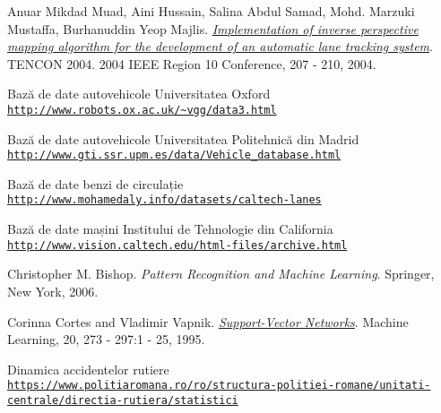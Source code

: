 \begin{thebibliography}{9}
	
	\hypertarget{AnuarMikdadMuadAiniHussainSalinaAbdulSamadMohdMarzukiMustaffaBurhanuddinYeopMajlis}{} 
	Anuar Mikdad Muad, Aini Hussain, Salina Abdul Samad, Mohd. Marzuki Mustaffa, Burhanuddin Yeop Majlis.
	\textit{\href{http://ieeexplore.ieee.org/abstract/document/1414393/}{Implementation of inverse perspective mapping algorithm for the development of an automatic lane tracking system}}.
	TENCON 2004. 2004 IEEE Region 10 Conference, 207 - 210, 2004.
		
	\hypertarget{BazădedateautovehicoleUniversitateaOxford}{} 
	Bază de date autovehicole Universitatea Oxford
	\\\texttt{\url{http://www.robots.ox.ac.uk/~vgg/data3.html}}
	
	\hypertarget{BazădedateautovehicoleUniversitateaPolitehnicădinMadrid}{} 
	Bază de date autovehicole Universitatea Politehnică din Madrid
	\\\texttt{\url{http://www.gti.ssr.upm.es/data/Vehicle\_database.html}}
	
	\hypertarget{Bazădedatebenzidecirculație}{} 
	Bază de date benzi de circulație
	\\\texttt{\url{http://www.mohamedaly.info/datasets/caltech-lanes}}
	
	\hypertarget{BazădedatemașiniInstituluideTehnologiedinCalifornia}{} 
	Bază de date mașini Institului de Tehnologie din California
	\\\texttt{\url{http://www.vision.caltech.edu/html-files/archive.html}}
	
	\hypertarget{ChristopherBishop}{} 
	Christopher M. Bishop. 
	\textit{Pattern Recognition and Machine Learning}. 
	Springer, New York, 2006.
	
	\hypertarget{CorinnaCortesVladimirVapnik}{} 
	Corinna Cortes and Vladimir Vapnik.
	\textit{\href{http://image.diku.dk/imagecanon/material/cortes_vapnik95.pdf}{Support-Vector Networks}}.
	Machine Learning, 20, 273 - 297:1 - 25, 1995.
	
	\hypertarget{Dinamicaaccidentelorrutiere}{}  
	Dinamica accidentelor rutiere
	\\\texttt{\url{https://www.politiaromana.ro/ro/structura-politiei-romane/unitati-centrale/directia-rutiera/statistici}}
		

\end{thebibliography}
